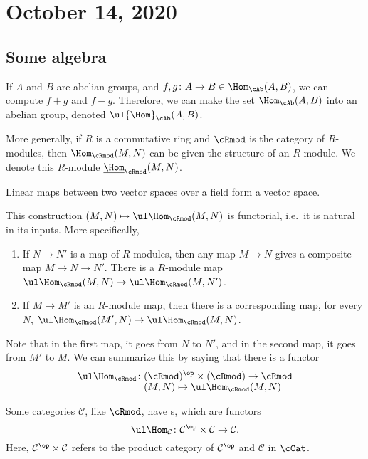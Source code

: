 \documentclass{standalone}
\begin{document}
\chapter{October 14, 2020}

\section{Some algebra}
If \(A\) and \(B\) are abelian groups,
and \(f, g \colon A \to B \in \Hom_{\cAb}(A, B)\),
we can compute \(f + g\) and \(f - g\).
Therefore, we can make the set \(\Hom_{\cAb}(A, B)\) into an abelian group,
denoted \(\ul{\Hom}_\cAb(A, B)\).

More generally, if \(R\) is a commutative ring and \(\cRmod\) is
the category of \(R\)-modules, then \(\Hom_\cRmod(M, N)\) can be
given the structure of an \(R\)-module.
We denote this \(R\)-module \(\underline{\Hom}_\cRmod(M, N)\).

\begin{example}
  Linear maps between two vector spaces over a field form a vector space.
\end{example}

This construction \((M, N) \mapsto \ul\Hom_{\cRmod}(M, N)\) is functorial,
i.e.\ it is natural in its inputs. More specifically,
\begin{enumerate}
  \item If \(N \to N'\) is a map of \(R\)-modules, then any map \(M \to N\)
        gives a composite map \(M \to N \to N'\). There is a \(R\)-module map
        \(\ul\Hom_\cRmod(M, N) \to \ul\Hom_\cRmod(M, N')\).
  \item If \(M \to M'\) is an \(R\)-module map, then there is a corresponding
        map, for every \(N\),
        \(\ul\Hom_\cRmod(M', N) \to \ul\Hom_\cRmod(M, N)\).
\end{enumerate}
Note that in the first map, it goes from \(N\) to \(N'\),
and in the second map, it goes from \(M'\) to \(M\).
We can summarize this by saying that there is a functor
\begin{align*}
  \ul\Hom_\cRmod \colon& (\cRmod)^\op \times (\cRmod) \to \cRmod \\[-1ex]
    & (M, N) \mapsto \ul\Hom_\cRmod(M, N)
\end{align*}

Some categories \(\mathcal C\), like \(\cRmod\), have s,
which are functors
\[
  \ul\Hom_{\mathcal C} \colon \mathcal C^\op \times \mathcal C \to \mathcal C.
\]
Here, \(\mathcal C^\op \times \mathcal C\) refers to the product category
of \(\mathcal C^\op\) and \(\mathcal C\) in \(\cCat\).
\end{document}
